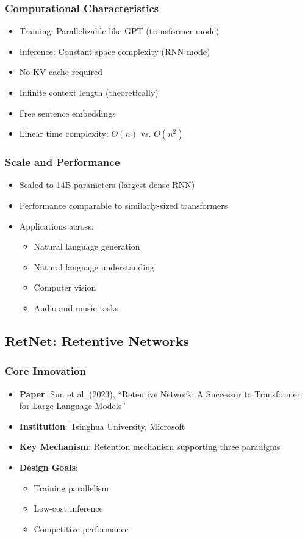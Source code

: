 \documentclass[11pt]{article}
\begin{document}
\subsubsection{Computational Characteristics}
\begin{itemize}[leftmargin=*]
    \item Training: Parallelizable like GPT (transformer mode)
    \item Inference: Constant space complexity (RNN mode)
    \item No KV cache required
    \item Infinite context length (theoretically)
    \item Free sentence embeddings
    \item Linear time complexity: $O(n)$ vs. $O(n^2)$
\end{itemize}

\subsubsection{Scale and Performance}
\begin{itemize}[leftmargin=*]
    \item Scaled to 14B parameters (largest dense RNN)
    \item Performance comparable to similarly-sized transformers
    \item Applications across:
    \begin{itemize}
        \item Natural language generation
        \item Natural language understanding
        \item Computer vision
        \item Audio and music tasks
    \end{itemize}
\end{itemize}

\subsection{RetNet: Retentive Networks}

\subsubsection{Core Innovation}
\begin{itemize}[leftmargin=*]
    \item \textbf{Paper}: Sun et al. (2023), ``Retentive Network: A Successor to Transformer for Large Language Models''~\cite{sun2023retentive}
    \item \textbf{Institution}: Tsinghua University, Microsoft
    \item \textbf{Key Mechanism}: Retention mechanism supporting three paradigms
    \item \textbf{Design Goals}:
    \begin{itemize}
        \item Training parallelism
        \item Low-cost inference
        \item Competitive performance
    \end{itemize}
\end{itemize}
\end{document}

